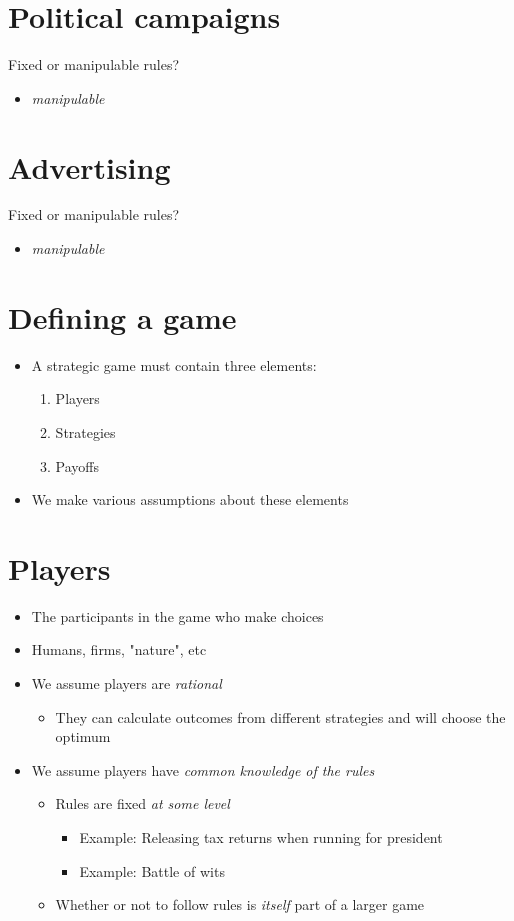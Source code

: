 \documentclass[11pt]{article}
\begin{document}
\section*{Political campaigns}
\label{sec:org283c344}
Fixed or manipulable rules?
\begin{itemize}
\item \emph{manipulable}
\end{itemize}

\section*{Advertising}
\label{sec:org2b7ac5b}
Fixed or manipulable rules?
\begin{itemize}
\item \emph{manipulable}
\end{itemize}

\section*{Defining a game}
\label{sec:org2fe3030}
\begin{itemize}
\item A strategic game must contain three elements:
\begin{enumerate}
\item Players
\item Strategies
\item Payoffs
\end{enumerate}
\item We make various assumptions about these elements
\end{itemize}

\section*{Players}
\label{sec:org919ef54}
\begin{itemize}
\item The participants in the game who make choices
\item Humans, firms, "nature", etc
\item We assume players are \emph{rational}
\begin{itemize}
\item They can calculate outcomes from different strategies and will choose the optimum
\end{itemize}
\item We assume players have \emph{common knowledge of the rules}
\begin{itemize}
\item Rules are fixed \emph{at some level}
\begin{itemize}
\item Example: Releasing tax returns when running for president
\item Example: Battle of wits
\end{itemize}
\item Whether or not to follow rules is \emph{itself} part of a larger game
\end{itemize}
\end{itemize}
\end{document}

